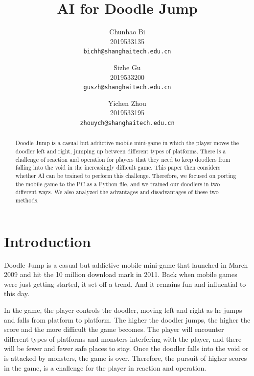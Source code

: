 \documentclass[final]{cvpr}
\begin{document}
\title{ AI for Doodle Jump }

\author{
    Chunhao Bi\\
    2019533135\\
    {\tt\small bichh@shanghaitech.edu.cn}
    \and
    Sizhe Gu\\
    2019533200\\
    {\tt\small guszh@shanghaitech.edu.cn}
    \and
    Yichen Zhou\\
    2019533195\\
    {\tt\small zhouych@shanghaitech.edu.cn}
}

\maketitle


\begin{abstract}
Doodle Jump is a casual but addictive mobile mini-game in which the player moves the doodler left and right, jumping up between different types of platforms. There is a challenge of reaction and operation for players that they need to keep doodlers from falling into the void in the increasingly difficult game. This paper then considers whether AI can be trained to perform this challenge. Therefore, we focused on porting the mobile game to the PC as a Python file, and we trained our doodlers in two different ways. We also analyzed the advantages and disadvantages of these two methods.
\end{abstract}

\section{Introduction}
Doodle Jump is a casual but addictive mobile mini-game that launched in March 2009 and hit the 10 million download mark in 2011. Back when mobile games were just getting started, it set off a trend. And it remains fun and influential to this day.

In the game, the player controls the doodler, moving left and right as he jumps and falls from platform to platform. The higher the doodler jumps, the higher the score and the more difficult the game becomes. The player will encounter different types of platforms and monsters  interfering with the player, and there will be fewer and fewer safe places to stay. Once the doodler falls into the void or is attacked by monsters, the game is over. Therefore, the pursuit of higher scores in the game, is a challenge for the player in reaction and operation.
 
\end{document}
